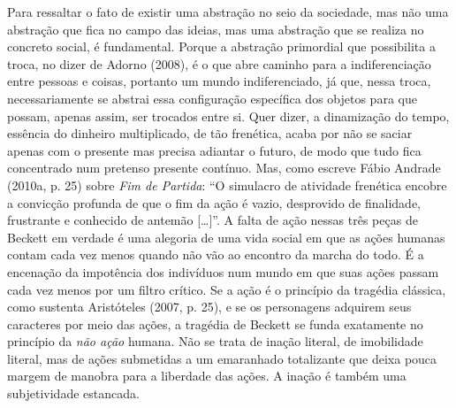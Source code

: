 Para ressaltar o fato de existir uma abstração no seio da
sociedade, mas não uma abstração que fica no campo das ideias, mas uma
abstração que se realiza no concreto social, é fundamental. Porque a
abstração primordial que possibilita a troca, no dizer de Adorno (2008),
é o que abre caminho para a indiferenciação entre pessoas e coisas,
portanto um mundo indiferenciado, já que, nessa troca, necessariamente
se abstrai essa configuração específica dos objetos para que possam,
apenas assim, ser trocados entre si. Quer dizer, a dinamização do tempo,
essência do dinheiro multiplicado, de tão frenética, acaba por não se
saciar apenas com o presente mas precisa adiantar o futuro, de modo que
tudo fica concentrado num pretenso presente contínuo. Mas, como escreve
Fábio Andrade (2010a, p. 25) sobre \emph{Fim de Partida}: ``O simulacro
de atividade frenética encobre a convicção profunda de que o fim da ação
é vazio, desprovido de finalidade, frustrante e conhecido de antemão
[\ldots{}]''. A falta de ação nessas três peças de Beckett em verdade é
uma alegoria de uma vida social em que as ações humanas contam cada vez
menos quando não vão ao encontro da marcha do todo. É a encenação da
impotência dos indivíduos num mundo em que suas ações passam cada vez
menos por um filtro crítico. Se a ação é o princípio da tragédia
clássica, como sustenta Aristóteles (2007, p. 25), e se os personagens
adquirem seus caracteres por meio das ações, a tragédia de Beckett se
funda exatamente no princípio da \emph{não ação} humana. Não se trata de
inação literal, de imobilidade literal, mas de ações submetidas a um
emaranhado totalizante que deixa pouca margem de manobra para a
liberdade das ações. A inação é também uma subjetividade estancada.

